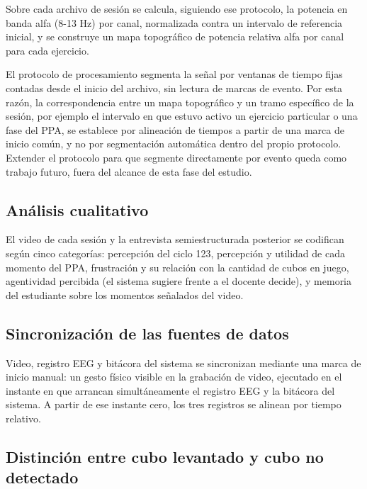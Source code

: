\documentclass{book}
\begin{document}
Sobre cada archivo de sesión se calcula, siguiendo ese protocolo, la potencia en banda alfa (8-13 Hz) por canal, normalizada contra un intervalo de referencia inicial, y se construye un mapa topográfico de potencia relativa alfa por canal para cada ejercicio.

El protocolo de procesamiento segmenta la señal por ventanas de tiempo fijas contadas desde el inicio del archivo, sin lectura de marcas de evento. Por esta razón, la correspondencia entre un mapa topográfico y un tramo específico de la sesión, por ejemplo el intervalo en que estuvo activo un ejercicio particular o una fase del PPA, se establece por alineación de tiempos a partir de una marca de inicio común, y no por segmentación automática dentro del propio protocolo. Extender el protocolo para que segmente directamente por evento queda como trabajo futuro, fuera del alcance de esta fase del estudio.

\subsection{Análisis cualitativo}

El video de cada sesión y la entrevista semiestructurada posterior se codifican según cinco categorías: percepción del ciclo 123, percepción y utilidad de cada momento del PPA, frustración y su relación con la cantidad de cubos en juego, agentividad percibida (el sistema sugiere frente a el docente decide), y memoria del estudiante sobre los momentos señalados del video.

\subsection{Sincronización de las fuentes de datos}

Video, registro EEG y bitácora del sistema se sincronizan mediante una marca de inicio manual: un gesto físico visible en la grabación de video, ejecutado en el instante en que arrancan simultáneamente el registro EEG y la bitácora del sistema. A partir de ese instante cero, los tres registros se alinean por tiempo relativo.

\subsection{Distinción entre cubo levantado y cubo no detectado}
\end{document}
